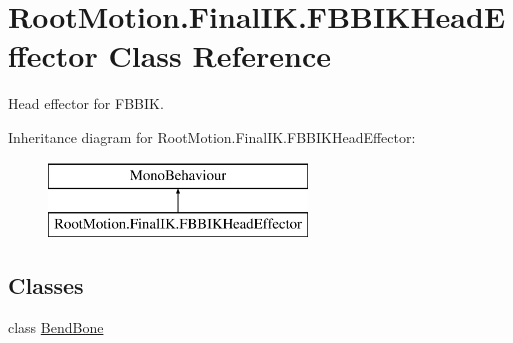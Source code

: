\hypertarget{class_root_motion_1_1_final_i_k_1_1_f_b_b_i_k_head_effector}{}\section{Root\+Motion.\+Final\+I\+K.\+F\+B\+B\+I\+K\+Head\+Effector Class Reference}
\label{class_root_motion_1_1_final_i_k_1_1_f_b_b_i_k_head_effector}


Head effector for F\+B\+B\+IK.  


Inheritance diagram for Root\+Motion.\+Final\+I\+K.\+F\+B\+B\+I\+K\+Head\+Effector\+:\begin{figure}[H]
\begin{center}
\leavevmode
\includegraphics[height=2.000000cm]{class_root_motion_1_1_final_i_k_1_1_f_b_b_i_k_head_effector}
\end{center}
\end{figure}
\subsection*{Classes}
\begin{DoxyCompactItemize}
\item 
class \mbox{\hyperlink{class_root_motion_1_1_final_i_k_1_1_f_b_b_i_k_head_effector_1_1_bend_bone}{Bend\+Bone}}
\end{DoxyCompactItemize}
